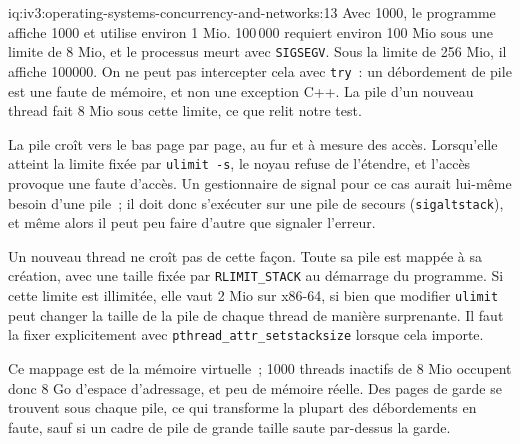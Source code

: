 \begin{solution}{iq:iv3:operating-systems-concurrency-and-networks:13}
Avec 1000, le programme affiche 1000 et utilise environ 1 Mio. 100\,000 requiert environ 100 Mio sous une limite de 8 Mio, et le processus meurt avec \texttt{SIGSEGV}. Sous la limite de 256 Mio, il affiche 100000. On ne peut pas intercepter cela avec \texttt{try}~: un débordement de pile est une faute de mémoire, et non une exception C++. La pile d'un nouveau thread fait 8 Mio sous cette limite, ce que relit notre test.

La pile croît vers le bas page par page, au fur et à mesure des accès. Lorsqu'elle atteint la limite fixée par \texttt{ulimit -s}, le noyau refuse de l'étendre, et l'accès provoque une faute d'accès. Un gestionnaire de signal pour ce cas aurait lui-même besoin d'une pile~; il doit donc s'exécuter sur une pile de secours (\texttt{sigaltstack}), et même alors il peut peu faire d'autre que signaler l'erreur.

Un nouveau thread ne croît pas de cette façon. Toute sa pile est mappée à sa création, avec une taille fixée par \texttt{RLIMIT\_STACK} au démarrage du programme. Si cette limite est illimitée, elle vaut 2 Mio sur x86-64, si bien que modifier \texttt{ulimit} peut changer la taille de la pile de chaque thread de manière surprenante. Il faut la fixer explicitement avec \texttt{pthread\_attr\_setstacksize} lorsque cela importe.

Ce mappage est de la mémoire virtuelle~; 1000 threads inactifs de 8 Mio occupent donc 8 Go d'espace d'adressage, et peu de mémoire réelle. Des pages de garde se trouvent sous chaque pile, ce qui transforme la plupart des débordements en faute, sauf si un cadre de pile de grande taille saute par-dessus la garde.

\end{solution}

